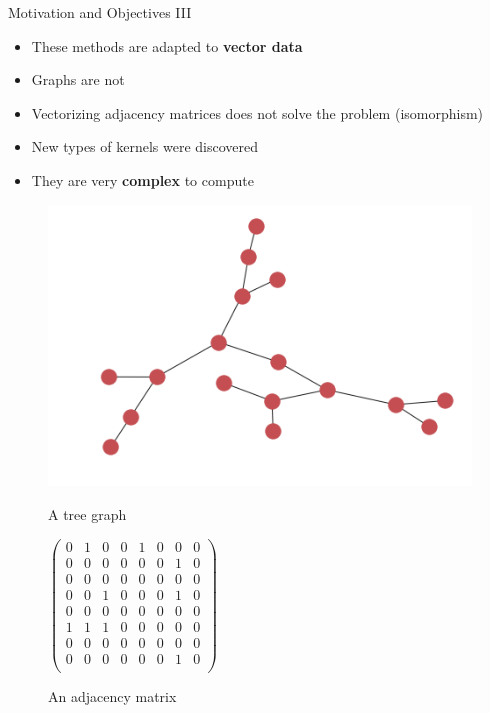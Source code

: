 \documentclass[compress]{beamer}
\begin{document}
\begin{frame}{Motivation and Objectives III}
\begin{itemize}
	\item These methods are adapted to \textbf{vector data}
	\item Graphs are not
	\item Vectorizing adjacency matrices does not solve the problem (isomorphism)
	\item New types of kernels were discovered
	\item They are very \textbf{complex} to compute
\end{itemize}
\begin{figure}
	\begin{multicols}{2}
		\includegraphics[width=\linewidth]{data/graphs/big_graph_no_label.png}
		\caption*{A tree graph}\par
		$\begin{pmatrix}
		0 & 1 & 0 & 0 & 1 & 0 & 0 & 0 \\ 
		0 & 0 & 0 & 0 & 0 & 0 & 1 & 0 \\
		0 & 0 & 0 & 0 & 0 & 0 & 0 & 0 \\
		0 & 0 & 1 & 0 & 0 & 0 & 1 & 0 \\
		0 & 0 & 0 & 0 & 0 & 0 & 0 & 0 \\
		1 & 1 & 1 & 0 & 0 & 0 & 0 & 0 \\
		0 & 0 & 0 & 0 & 0 & 0 & 0 & 0 \\
		0 & 0 & 0 & 0 & 0 & 0 & 1 & 0 \\
		\end{pmatrix}$
		\caption*{An adjacency matrix}
	\end{multicols}
\end{figure}
\end{frame}
\end{document}
